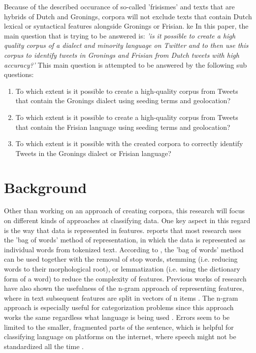 \documentclass[
10pt, %
a4paper, %
oneside, %
headinclude,footinclude, %
] {book}%
\begin{document}
Because of the described occurance of so-called 'frisismes' and texts that are hybrids of Dutch and Gronings, corpora will not exclude texts that contain Dutch lexical or syntactical features alongside Gronings or Frisian.
ke 
In this paper, the main question that is trying to be answered is: \emph{'is it possible to create a high quality corpus of a dialect and minority language on Twitter and to then use this corpus to identify tweets in Gronings and Frisian from Dutch tweets with high accuracy?'} 
This main question is attempted to be answered by the following sub questions: 
\begin{enumerate}

\item To which extent is it possible to create a high-quality corpus from Tweets that contain the Gronings dialect using seeding terms and geolocation?
\item To which extent is it possible to create a high-quality corpus from Tweets that contain the Frisian language using seeding terms and geolocation?
\item To which extent is it possible with the created corpora to correctly identify Tweets in the Gronings dialect or Frisian language?

\end{enumerate}


\chapter{Background}

Other than working on an approach of creating corpora, this research will focus on different kinds of approaches at classifying data. One key aspect in this regard is the way that data is represented in features. \citet{scott} reports that most research uses the 'bag of words' method of representation, in which the data is represented as individual words from tokenized text. According to \citet{scott}, the 'bag of words' method can be used together with the removal of stop words, stemming (i.e. reducing words to their morphological root), or lemmatization (i.e. using the dictionary form of a word) to reduce the complexity of features.
Previous works of research have also shown the usefulness of the n-gram approach of representing features, where in text subsequent features are split in vectors of n items \citep{scott}. The n-gram approach is especially useful for categorization problems since this approach works the same regardless what language is being used \citep{silva}. Errors seem to be limited to the smaller, fragmented parts of the sentence, which is helpful for classifying language on platforms on the internet, where speech might not be standardized all the time \citep{silva}.
\end{document}
